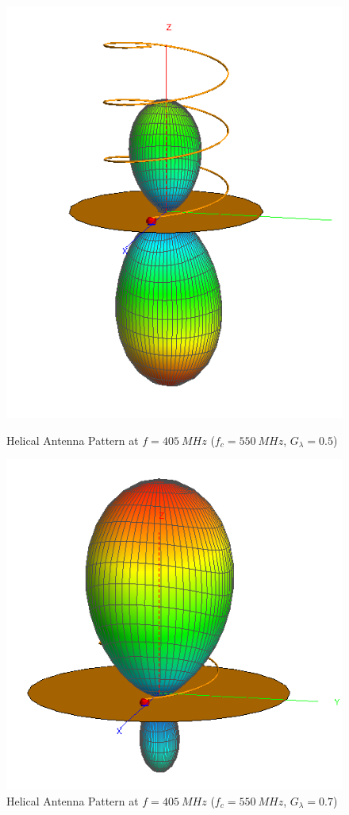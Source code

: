 \begin{figure}[!htb]
  \begin{minipage}{.48\textwidth}
    \centering
    \includegraphics[width=0.6\linewidth]{helix2_pattern_405MHz}
    \caption{Helical Antenna Pattern at $f = \SI{405}{MHz}$ ($f_c = \SI{550}{MHz}$, $G_\lambda = 0.5$)}
    \label{fig:helix2_pattern_405MHz}
  \end{minipage}
  \begin{minipage}{.48\textwidth}
    \centering
    \includegraphics[width=0.75\linewidth]{helix3_pattern_405MHz}
    \caption{Helical Antenna Pattern at $f = \SI{405}{MHz}$ ($f_c = \SI{550}{MHz}$, $G_\lambda = 0.7$)}
    \label{fig:helix3_pattern_405MHz}
  \end{minipage}
\end{figure}

